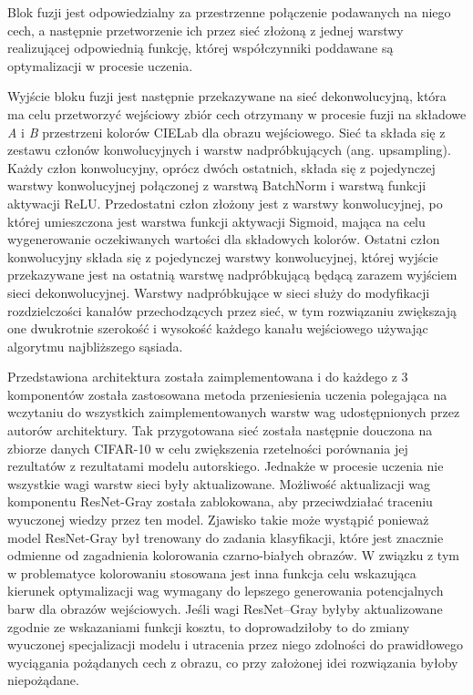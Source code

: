   Blok fuzji jest odpowiedzialny za przestrzenne połączenie podawanych
  na niego cech, a następnie przetworzenie ich przez sieć złożoną z jednej
  warstwy realizującej odpowiednią funkcję, której współczynniki poddawane są
  optymalizacji w procesie uczenia.

  Wyjście bloku fuzji jest następnie przekazywane na sieć dekonwolucyjną, która
  ma celu przetworzyć wejściowy zbiór cech otrzymany w procesie fuzji na składowe
  \textit{A} i \textit{B} przestrzeni kolorów CIELab dla obrazu wejściowego.
  Sieć ta składa się z zestawu członów konwolucyjnych i warstw nadpróbkujących
  (ang. upsampling). Każdy człon konwolucyjny, oprócz dwóch ostatnich, składa się z pojedynczej
  warstwy konwolucyjnej połączonej z warstwą BatchNorm i warstwą funkcji
  aktywacji ReLU. Przedostatni człon złożony jest z warstwy konwolucyjnej, po
  której umieszczona jest warstwa funkcji aktywacji Sigmoid, mająca na celu
  wygenerowanie oczekiwanych wartości dla składowych kolorów. Ostatni człon
  konwolucyjny składa się z pojedynczej warstwy konwolucyjnej, której wyjście
  przekazywane jest na ostatnią warstwę nadpróbkującą będącą zarazem wyjściem
  sieci dekonwolucyjnej.
  Warstwy nadpróbkujące w sieci służy do modyfikacji rozdzielczości kanałów
  przechodzących przez sieć, w tym rozwiązaniu zwiększają one
  dwukrotnie szerokość i wysokość każdego kanału wejściowego używając algorytmu
  najbliższego sąsiada.

  Przedstawiona architektura została zaimplementowana i do każdego z 3
  komponentów została zastosowana metoda przeniesienia uczenia polegająca na
  wczytaniu do wszystkich zaimplementowanych warstw wag udostępnionych przez
  autorów architektury. Tak przygotowana sieć została następnie douczona
  na zbiorze danych CIFAR-10 w celu zwiększenia rzetelności porównania jej
  rezultatów z rezultatami modelu autorskiego. Jednakże w procesie uczenia
  nie wszystkie wagi warstw sieci były aktualizowane.
  Możliwość aktualizacji wag komponentu ResNet-Gray została zablokowana, aby
  przeciwdziałać traceniu wyuczonej wiedzy przez ten model.
  Zjawisko takie może wystąpić ponieważ model ResNet-Gray był trenowany do
  zadania klasyfikacji, które jest znacznie odmienne od zagadnienia kolorowania
  czarno-białych obrazów. W związku z tym w problematyce kolorowaniu stosowana jest inna
  funkcja celu wskazująca kierunek optymalizacji wag wymagany do lepszego
  generowania potencjalnych barw dla obrazów wejściowych. Jeśli wagi ResNet--Gray
  byłyby aktualizowane zgodnie ze wskazaniami funkcji kosztu, to doprowadziłoby
  to do zmiany wyuczonej specjalizacji modelu i utracenia przez niego zdolności
  do prawidłowego wyciągania pożądanych cech z obrazu, co przy założonej idei
  rozwiązania byłoby niepożądane.

